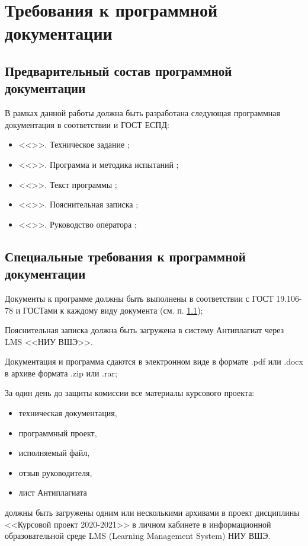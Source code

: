 \documentclass[a4paper,12pt,reqno]{article}
\begin{document}
  \newpage
  \section{Требования к программной документации}
  \subsection{Предварительный состав программной документации}
  \label{sec:doclist}
  В рамках данной работы должна быть разработана следующая программная документация в соответствии и ГОСТ ЕСПД:
  \begin{itemize}
    \item <<\CRTname>>. Техническое задание \cite{gostTZ};
    \item <<\CRTname>>. Программа и методика испытаний \cite{gostPMI};
    \item <<\CRTname>>. Текст программы \cite{gostTP};
    \item <<\CRTname>>. Пояснительная записка \cite{gostPZ};
    \item <<\CRTname>>. Руководство оператора \cite{gostRO};
  \end{itemize}

  \subsection{Специальные требования к программной документации}
  Документы к программе должны быть выполнены в соответствии с ГОСТ 19.106-78 и ГОСТами к каждому виду документа (см. п. \ref{sec:doclist});

  Пояснительная записка должна быть загружена в систему Антиплагиат через LMS <<НИУ ВШЭ>>.

  Документация и программа сдаются в электронном виде в формате .pdf или .docx в архиве формата .zip или .rar;

  За один день до защиты комиссии все материалы курсового проекта:
  \begin{itemize}
    \item техническая документация,
    \item программный проект,
    \item исполняемый файл,
    \item отзыв руководителя,
    \item лист Антиплагиата
  \end{itemize}
  должны быть загружены одним или несколькими архивами в проект дисциплины <<Курсовой проект 2020-2021>> в личном кабинете в информационной образовательной среде LMS (Learning Management System) НИУ ВШЭ.
\end{document}
